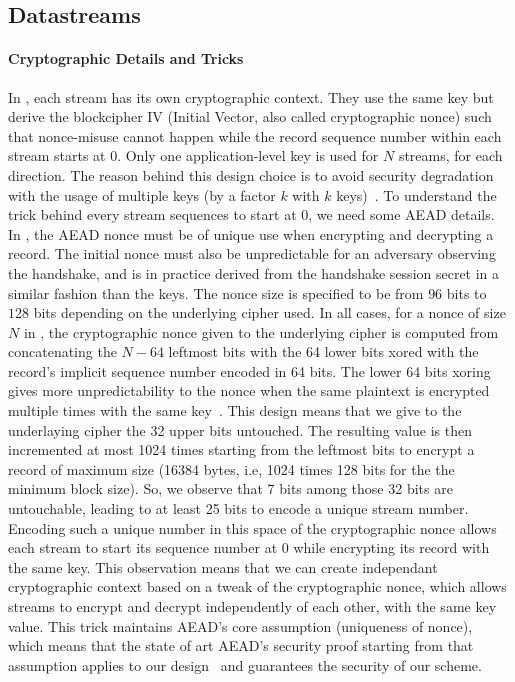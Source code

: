 
\subsection{Datastreams}
\label{sec:datastreams}

\paragraph*{Cryptographic Details and Tricks}
In \tcpls, each stream has its own cryptographic context. They use the same key
but derive the blockcipher IV (Initial Vector, also called cryptographic nonce)
such that nonce-misuse cannot happen while the record sequence number within
each stream starts at 0. Only one application-level key is used for $N$ streams,
for each direction.  The reason behind this design choice is to avoid security
degradation with the usage of multiple keys (by a factor $k$ with $k$
keys)~\cite{chatterjee2011another}. To understand the trick behind every
stream sequences to start at 0, we need some AEAD details. In \tcpls, the AEAD
nonce must be of unique use when encrypting and decrypting a record. The
initial nonce must also be unpredictable for an adversary observing the
handshake, and is in practice derived from the \tls handshake session secret in
a similar fashion than the \tls keys. The nonce size is specified to be from
$96$ bits to $128$ bits depending on the underlying cipher used. In all cases,
for a nonce of size $N$ in \tls, the cryptographic nonce given to the underlying
cipher is computed from concatenating the $N-64$ leftmost bits with the 64 lower
bits xored with the record's implicit sequence number encoded in 64 bits. The
lower 64 bits xoring gives more unpredictability to the nonce when the same
plaintext is encrypted multiple times with the same
key~\cite{bellare2016multi,hoang2018multi}. This design means that we give to
the underlaying cipher the 32 upper bits untouched. The resulting value is then
incremented at most 1024 times starting from the leftmost bits to encrypt a \tls
record of maximum size (16384 bytes, i.e, 1024 times 128 bits for the the
minimum block size). So, we observe that 7 bits among those 32 bits are
untouchable, leading to at least 25 bits to encode a unique stream number.
Encoding such a unique number in this space of the cryptographic nonce allows
each stream to start its sequence number at 0 while encrypting its record with
the same key. This observation means that we can create independant
cryptographic context based on a tweak of the cryptographic nonce, which allows
streams to encrypt and decrypt independently of each other, with the same key
value. This trick maintains AEAD's core assumption (uniqueness of nonce), which
means that the state of art AEAD's security proof starting from that assumption
applies to our design~\cite{chatterjee2011another} and guarantees the security
of our scheme.

